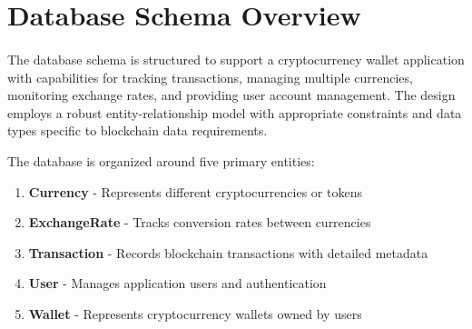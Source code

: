\section{Database Schema Overview}
\paragraph{}The database schema is structured to support a cryptocurrency wallet application with capabilities for tracking transactions, managing multiple currencies, monitoring exchange rates, and providing user account management. The design employs a robust entity-relationship model with appropriate constraints and data types specific to blockchain data requirements.

The database is organized around five primary entities:

\begin{enumerate}
    \item \textbf{Currency} - Represents different cryptocurrencies or tokens
    \item \textbf{ExchangeRate} - Tracks conversion rates between currencies
    \item \textbf{Transaction} - Records blockchain transactions with detailed metadata
    \item \textbf{User} - Manages application users and authentication
    \item \textbf{Wallet} - Represents cryptocurrency wallets owned by users
\end{enumerate}

